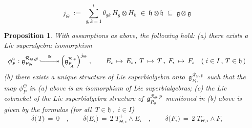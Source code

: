 \documentclass[10pt,a4paper]{amsart}
\newtheorem{prop}{Proposition}
\def \Ppicc {{\scriptscriptstyle P}}
\newcommand{\R}{{\mathcal R}}
\def \Thetapicc {{\scriptscriptstyle \Theta}}
\def \lieg{\mathfrak{g}}
\def \liegRpPa{\mathfrak{g}^{\raise1pt\hbox{$ \scriptscriptstyle \mathcal{R},p $}}_{\Ppicc_{\raise-3pt\hbox{$ \scriptscriptstyle \!\! A $}}}}
\def \lieh{\mathfrak{h}}
\begin{document}
\begin{equation}  \label{eq: def_twist_Lie-bialg}
  j_\Thetapicc  \; := \;  {\textstyle \sum_{g,k=1}^t} \theta_{gk} \, H_g \otimes H_k  \;
  \in \; \lieh \otimes \lieh  \; \subseteq \;  \lieg \otimes \lieg
%
\end{equation}

\begin{prop}  \label{prop: Yamane's twist-liegRPa = liegRP-twist}
%
   With assumptions as above, the following hold:
%
 \vskip5pt
%
   (a)\;  there exists a Lie superalgebra isomorphism
%
  $$  \phi^\Thetapicc_\Ppicc : \lieg_{P_\Theta}^{\R_\Thetapicc,p} \, {\buildrel \cong \over
 {\lhook\joinrel\relbar\joinrel\relbar\joinrel\relbar\joinrel\twoheadrightarrow}} \,
{\Big( \liegRpPa \Big)}^{j_\Thetapicc} \; ,  \qquad
%
  E_i \, \mapsto \, E_i \, , \; T \, \mapsto \, T \, , \; F_i \, \mapsto \, F_i \quad
  (\; i \in I \, , \, T \in \lieh \,)  $$
%
 \vskip1pt
%
   (b)\;  there exists a unique structure of Lie super\textsl{bi}algebra onto  $ \, \lieg_{P_\Theta}^{\R_\Thetapicc,p} \, $  such that the map  $ \phi^\Thetapicc_\Ppicc $
   in (a) above is an isomorphism of Lie super\textsl{bi}algebras;
%
 \vskip5pt
%
   (c)\;  the Lie cobracket of the Lie super\textsl{bi}algebra structure of  $ \, \lieg_{P_\Theta}^{\R_\Thetapicc,p} \, $  mentioned in (b) above is given by the formulas
   (for all  $ \, T \in \lieh \, $,  $ \, i \in I $)
%
  $$  \delta\big(\,T\big) \, = \, 0  \quad ,   \qquad  \delta\big(E_i\big) \, = \, 2 \; T^+_{\Thetapicc,i} \wedge E_i  \quad ,   \qquad  \delta\big(F_i\big) \, = \,  2 \; T^-_{\Thetapicc,i} \wedge F_i  $$
%
\end{prop}
\end{document}
